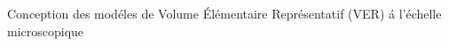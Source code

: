 \documentclass[final]{beamer}
\begin{document}
\begin{frame}
\begin{center}
\begin{minipage}{\textwidth}
\begin{exampleblock}{\rule[-0.6ex]{0pt}{50pt}\centering\LARGE Conception des mod\'eles de Volume \'El\'ementaire Repr\'esentatif (VER) \'a l'\'echelle microscopique}
\begin{columns}
\begin{column}{0.2\textwidth}
\begin{center}
\begin{figure}[!h]
\end{figure}
     \end{center}
\end{column}
\end{columns}
\end{exampleblock}
\end{minipage}
\end{center}


\end{frame}
\end{document}

